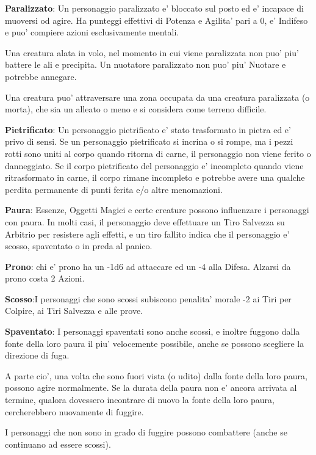 \documentclass[a4paper,11pt,twoside,openany]{book}
\begin{document}
{		\textbf{Paralizzato}: Un personaggio paralizzato e' bloccato sul posto ed e' incapace di muoversi od agire. Ha punteggi effettivi di Potenza e Agilita' pari a 0, e' Indifeso e puo' compiere azioni esclusivamente mentali.
		
		Una creatura alata in volo, nel momento in cui viene paralizzata non puo' piu' battere le ali e precipita. 
		Un nuotatore paralizzato non puo' piu' Nuotare e potrebbe annegare. 
		
		Una creatura puo' attraversare una zona occupata da una creatura paralizzata (o morta), che sia un alleato o meno e si considera come terreno difficile.
		
		\textbf{Pietrificato}: Un personaggio pietrificato e' stato trasformato in pietra ed e' privo di sensi. Se un personaggio pietrificato si incrina o si rompe, ma i pezzi rotti sono uniti al corpo quando ritorna di carne, il personaggio non viene ferito o danneggiato. Se il corpo pietrificato del personaggio e' incompleto quando viene ritrasformato in carne, il corpo rimane incompleto e potrebbe avere una qualche perdita permanente di punti ferita e/o altre menomazioni.
		
		\textbf{Paura}: Essenze, Oggetti Magici e certe creature possono influenzare i personaggi con paura. In molti casi, il personaggio deve effettuare un Tiro Salvezza su Arbitrio per resistere agli effetti, e un tiro fallito indica che il personaggio e' scosso, spaventato o in preda al panico.
		
		\textbf{Prono}: chi e' prono ha un -1d6 ad attaccare ed un -4 alla Difesa. Alzarsi da prono costa 2 Azioni.
		
		\textbf{Scosso}:I personaggi che sono scossi subiscono penalita' morale -2 ai Tiri per Colpire, ai Tiri Salvezza e alle prove.
		
		\textbf{Spaventato}: I personaggi spaventati sono anche scossi, e inoltre fuggono dalla fonte della loro paura il piu' velocemente possibile, anche se possono scegliere la direzione di fuga. 
		
		A parte cio', una volta che sono fuori vista (o udito) dalla fonte della loro paura, possono agire normalmente. Se la durata della paura non e' ancora arrivata al termine, qualora dovessero incontrare di nuovo la fonte della loro paura, cercherebbero nuovamente di fuggire.
		
		I personaggi che non sono in grado di fuggire possono combattere (anche se continuano ad essere scossi).
		
}
\end{document}

